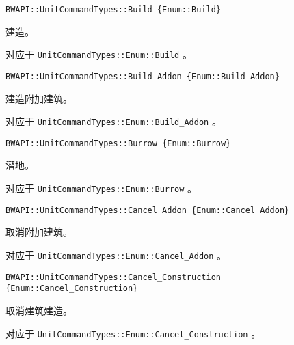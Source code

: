 \begin{tcolorbox}[colback=white, colframe=black!60!white, title=Build\{\}, arc=0mm]
\begin{verbatim}
BWAPI::UnitCommandTypes::Build {Enum::Build}
\end{verbatim}
建造。\par 对应于   \verb|UnitCommandTypes::Enum::Build|  。
\end{tcolorbox}


\begin{tcolorbox}[colback=white, colframe=black!60!white, title=Build\_Addon\{\}, arc=0mm]
\begin{verbatim}
BWAPI::UnitCommandTypes::Build_Addon {Enum::Build_Addon}
\end{verbatim}
建造附加建筑。\par 对应于   \verb|UnitCommandTypes::Enum::Build_Addon|  。
\end{tcolorbox}


\begin{tcolorbox}[colback=white, colframe=black!60!white, title=Burrow\{\}, arc=0mm]
\begin{verbatim}
BWAPI::UnitCommandTypes::Burrow {Enum::Burrow}
\end{verbatim}
潜地。\par 对应于   \verb|UnitCommandTypes::Enum::Burrow|  。
\end{tcolorbox}


\begin{tcolorbox}[colback=white, colframe=black!60!white, title=Cancel\_Addon\{\}, arc=0mm]
\begin{verbatim}
BWAPI::UnitCommandTypes::Cancel_Addon {Enum::Cancel_Addon}
\end{verbatim}
取消附加建筑。\par 对应于   \verb|UnitCommandTypes::Enum::Cancel_Addon|  。
\end{tcolorbox}


\begin{tcolorbox}[colback=white, colframe=black!60!white, title=Cancel\_Construction\{\}, arc=0mm]
\begin{verbatim}
BWAPI::UnitCommandTypes::Cancel_Construction {Enum::Cancel_Construction}
\end{verbatim}
取消建筑建造。\par 对应于   \verb|UnitCommandTypes::Enum::Cancel_Construction|  。
\end{tcolorbox}


